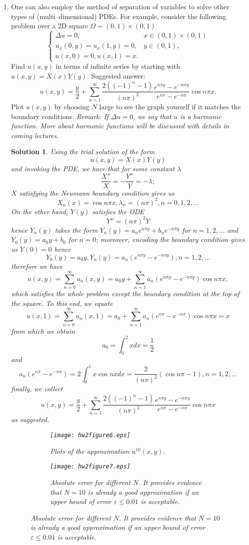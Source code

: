\documentclass[6pt]{article}
\newtheorem{solution}{Solution}
\numberwithin{equation}{section}
\begin{document}
\begin{enumerate}
\item One can also employ the method of separation of variables to solve other types of (multi--dimensional) PDEs.  For example, consider the following problem over a 2D square $\Omega=(0,1)\times(0,1)$
\begin{equation}
\left\{
\begin{array}{ll}
\Delta u=0,& x\in(0,1)\times(0,1)\\
u_x(0,y)=u_x(1,y)=0,&y\in(0,1),\\
u(x,0)=0, u(x,1)=x. &
\end{array}
\right.
\end{equation}
Find $u(x,y)$ in terms of infinite series by starting with $u(x,y)=X(x)Y(y)$.  Suggested answer:
\[u(x,y)=\frac{y}{2}+\sum_{n=1}^\infty \frac{2((-1)^n-1)}{(n\pi)^2}\frac{e^{n\pi y}-e^{-n\pi y}}{e^{n\pi}-e^{-n\pi}}\cos n\pi x.\]
Plot $u(x,y)$ by choosing $N$ large to see the graph yourself if it matches the boundary conditions.  \emph{Remark: If $\Delta u=0$, we say that $u$ is a harmonic function.  More about harmonic functions will be discussed with details in coming lectures.}
\begin{solution}
Using the trial solution of the form \[u(x,y)=X(x)Y(y)\]
and invoking the PDE, we have that for some constant $\lambda$
\[\frac{X''}{X}=-\frac{Y''}{Y}=-\lambda;\]
$X$ satisfying the Neumann boundary condition gives us
\[X_n(x)=\cos n \pi x, \lambda_n=(n\pi)^2,n=0,1,2,...\]
On the other hand, $Y(y)$ satisfies the ODE
\[Y''=(n\pi)^2Y\]
hence $Y_n(y)$ takes the form $Y_n(y)=a_ne^{n\pi y}+b_ne^{-n\pi y}$ for $n=1,2,...$ and $Y_0(y)=a_0y+b_0$ for $n=0$; moreover, encoding the boundary condition gives us $Y(0)=0$ hence
\[Y_0(y)=a_0y, Y_n(y)=a_n(e^{n\pi y}-e^{-n\pi y}), n=1,2,...\]
therefore we have
\[u(x,y)=\sum_{n=0}^\infty u_n(x,y)=a_0y+\sum_{n=1}^\infty a_n(e^{n\pi y}-e^{-n\pi y})\cos n\pi x,\]
which satisfies the whole problem except the boundary condition at the top of the square.  To this end, we equate
\[u(x,1)=\sum_{n=0}^\infty u_n(x,1)=a_0+\sum_{n=1}^\infty a_n(e^{n\pi }-e^{-n\pi })\cos n\pi x=x\]
from which we obtain
\[a_0=\int_0^2 xdx=\frac{1}{2}\]
and
\[a_n(e^{n\pi }-e^{-n\pi })=2\int_0^1 x\cos nx dx=\frac{2}{(n\pi)^2}(\cos n \pi-1),n=1,2,...\]
finally, we collect
\[u(x,y)=\frac{y}{2}+\sum_{n=1}^\infty \frac{2((-1)^n-1)}{(n\pi)^2}\frac{e^{n\pi y}-e^{-n\pi y}}{e^{n\pi}-e^{-n\pi}}\cos n\pi x\]
as suggested.
\begin{figure}[h!]%
    \centering
    \begin{subfigure}[b]{0.48\textwidth}
        \texttt{[image: hw2figure6.eps]}
        \caption{Plots of the approximation $u^{10}(x,y)$.}
    \end{subfigure}
    \begin{subfigure}[b]{0.48\textwidth}
        \texttt{[image: hw2figure7.eps]}
        \caption{Absolute error for different $N$.  It provides evidence that $N=10$ is already a good approximation if an upper bound of error $\varepsilon\leq 0.01$ is acceptable.}
    \end{subfigure}
\label{figure5}
\end{figure}
\end{solution}



\end{enumerate}
\end{document}
